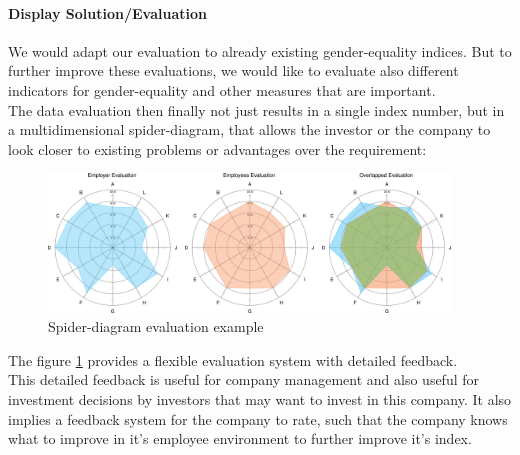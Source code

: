\paragraph*{Display Solution/Evaluation}
We would adapt our evaluation to already existing gender-equality indices. But to further improve these evaluations, we would like to evaluate also different indicators for gender-equality and other measures that are important.\\
The data evaluation then finally not just results in a single index number, but in a multidimensional spider-diagram, that allows the investor or the company to look closer to existing problems or advantages over the requirement:
\begin{figure}[H]
	\includegraphics[width=0.95\textwidth]{Bilder/spider-eval}
	\caption{Spider-diagram evaluation example}
	\label{Spider_diagram_evaluation}
\end{figure}
The figure \ref{Spider_diagram_evaluation} provides a flexible evaluation system with detailed feedback.\\
This detailed feedback is useful for company management and also useful for investment decisions by investors that may want to invest in this company. It also implies a feedback system for the company to rate, such that the company knows what to improve in it's employee environment to further improve it's index.